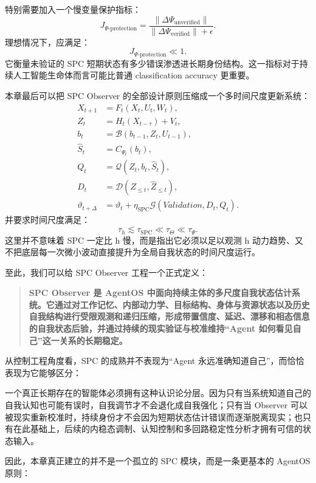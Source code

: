 特别需要加入一个慢变量保护指标：
\begin{equation}
J_{\Psi\text{-protection}}
=
\frac{
\|\Delta\Psi_{\mathrm{unverified}}\|
}{
\|\Delta\Psi_{\mathrm{verified}}\|+\epsilon
}.
\end{equation}
理想情况下，应满足：
\begin{equation}
J_{\Psi\text{-protection}}
\ll1.
\end{equation}
它衡量未验证的 SPC 短期状态有多少错误渗透进长期身份结构。这一指标对于持续人工智能生命体而言可能比普通 classification accuracy 更重要。

本章最后可以把 SPC Observer 的全部设计原则压缩成一个多时间尺度更新系统：
\begin{align}
X_{t+1}
&=
F_t(X_t,U_t,W_t),\\
Z_t
&=
H_t(X_{t-\tau})+V_t,\\
b_t
&=
\mathcal B
\left(
b_{t-1},Z_t,U_{t-1}
\right),\\
\hat S_t
&=
C_{\Psi_t}(b_t),\\
Q_t
&=
\mathcal Q
\left(
Z_t,b_t,\hat S_t
\right),\\
D_t
&=
\mathcal D
\left(
Z_{\leq t},
\hat Z_{\leq t}
\right),\\
\vartheta_{t+\Delta}
&=
\vartheta_t
+
\eta_{\mathrm{SPC}}
\mathcal G
\left(
Validation,
D_t,
Q_t
\right).
\end{align}
并要求时间尺度满足：
\begin{equation}
\boxed{
\tau_h
\lesssim
\tau_{\mathrm{SPC}}
\ll
\tau_{\Theta}
\ll
\tau_{\Psi}.
}
\end{equation}
这里并不意味着 SPC 一定比 h 慢，而是指出它必须以足以观测 h 动力趋势、又不把底层每一次微小波动直接提升为全局自我状态的时间尺度运行。

至此，我们可以给 SPC Observer 工程一个正式定义：

\begin{quote}
\textbf{SPC Observer 是 AgentOS 中面向持续主体的多尺度自我状态估计系统。它通过对工作记忆、内部动力学、目标结构、身体与资源状态以及历史自我结构进行受限观测和递归压缩，形成带置信度、延迟、漂移和相态信息的自我状态后验，并通过持续的现实验证与校准维持“Agent 如何看见自己”这一关系的长期稳定。}
\end{quote}

从控制工程角度看，SPC 的成熟并不表现为“Agent 永远准确知道自己”，而恰恰表现为它能够区分：
\begin{statementbox}
\centering
{}
\end{statementbox}
一个真正长期存在的智能体必须拥有这种认识论分层。因为只有当系统知道自己的自我认知也可能有误时，自我调节才不会退化成自我强化；只有当 Observer 可以被现实重新校准时，持续身份才不会因为短期状态估计错误而逐渐脱离现实；也只有在此基础上，后续的内稳态调制、认知控制和多回路稳定性分析才拥有可信的状态输入。

因此，本章真正建立的并不是一个孤立的 SPC 模块，而是一条更基本的 AgentOS 原则：

\begin{statementbox}
\centering
{}
\end{statementbox}
